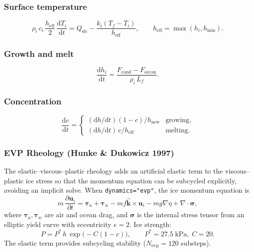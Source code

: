 \documentclass[11pt,a4paper]{article}
\newcommand{\dd}{\mathrm{d}}
\newcommand{\pp}{\partial}
\begin{document}
\subsubsection{Surface temperature}
\begin{equation}
  \rho_i\,c_i\,\frac{h_{\mathrm{eff}}}{2}\,\frac{\dd T_i}{\dd t} = Q_{\mathrm{sfc}} - \frac{k_i(T_f-T_i)}{h_{\mathrm{eff}}},
  \qquad h_{\mathrm{eff}}=\max(h_i,h_{\min}).
\end{equation}

\subsubsection{Growth and melt}
\begin{equation}
  \frac{\dd h_i}{\dd t} = \frac{F_{\mathrm{cond}}-F_{\mathrm{ocean}}}{\rho_i\,L_f}.
\end{equation}

\subsubsection{Concentration}
\begin{equation}
  \frac{\dd c}{\dd t} = \begin{cases}
    (\dd h/\dd t)(1-c)/h_{\mathrm{new}} & \text{growing},\\
    (\dd h/\dd t)\,c/h_{\mathrm{eff}} & \text{melting}.
  \end{cases}
\end{equation}

\subsubsection{EVP Rheology (Hunke \& Dukowicz 1997)}

The elastic--viscous--plastic rheology \citep{HunkeDukowicz1997} adds an
artificial elastic term to the viscous--plastic ice stress so that the
momentum equation can be subcycled explicitly, avoiding an implicit
solve.  When \texttt{dynamics="evp"}, the ice momentum equation is
\begin{equation}
  m\,\frac{\pp \bm{u}_i}{\pp t} = \bm{\tau}_a + \bm{\tau}_w - mf\hat{\bm{k}}\times\bm{u}_i - mg\nabla\eta + \nabla\cdot\bm{\sigma},
\end{equation}
where $\bm{\tau}_a,\bm{\tau}_w$ are air and ocean drag, and $\bm{\sigma}$ is the internal stress tensor from an elliptic yield curve with eccentricity $e=2$.  Ice strength:
\begin{equation}
  P = P^*\,h\,\exp\!\big(-C(1-c)\big), \qquad P^*=27.5\;\text{kPa},\; C=20.
\end{equation}
The elastic term provides subcycling stability ($N_{\mathrm{evp}}=120$ substeps).
\end{document}
